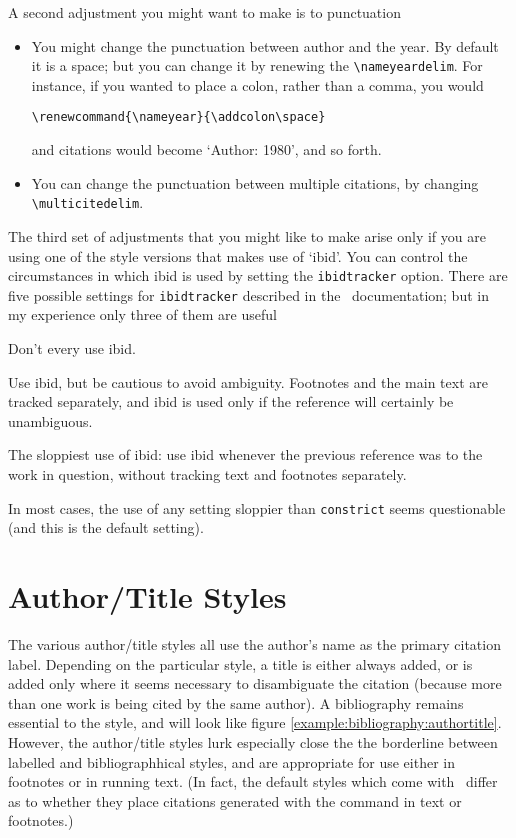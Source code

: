 A second adjustment you might want to make is to punctuation
\begin{itemize}
\item You might change the punctuation
between author and the year. By default it is a space; but you can
change it by renewing the \verb|\nameyeardelim|. For instance, if you
wanted to place a colon, rather than a comma, you would
\begin{verbatim}
\renewcommand{\nameyear}{\addcolon\space}
\end{verbatim}
and citations would become `Author: 1980', and so forth.
\item You can change the punctuation between multiple citations, by
  changing \verb|\multicitedelim|.
\end{itemize}

The third set of adjustments that you might like to make arise only if
you are using one of the style versions that makes use of `ibid'. You
can control the circumstances in which ibid is used by setting the
\verb|ibidtracker| option. There are five possible settings for
\verb|ibidtracker| described in the \biblatex\ documentation; but in
my experience only three of them are useful
\begin{description}[font=\ttfamily\upshape\bfseries]
\item[ibidtracker=false] Don't every use ibid.
\item[ibidtracker=constrict] Use ibid, but be cautious to avoid
  ambiguity. Footnotes and the main text are tracked separately, and
  ibid is used only if the reference will certainly be unambiguous.
\item[ibidtracker=true] The sloppiest use of ibid: use ibid whenever
  the previous reference was to the work in question, without tracking
  text and footnotes separately.
\end{description}
In most cases, the use of any setting sloppier than \texttt{constrict}
seems questionable (and this is the default setting).




\section{Author/Title Styles}

The various author/title styles all use the author's name as the
primary citation label. Depending on the particular style, a title is
either always added, or is added only where it seems necessary to
disambiguate the citation (because more than one work is being cited
by the same author). A bibliography remains essential to the style,
and will look like figure
\ref{example:bibliography:authortitle}. However, the author/title
styles lurk especially close the the borderline between labelled and
bibliographhical styles, and are appropriate for use either in
footnotes or in running text. (In fact, the default styles which come
with \biblatex\ differ as to whether they place citations generated
with the  command in text or footnotes.)

